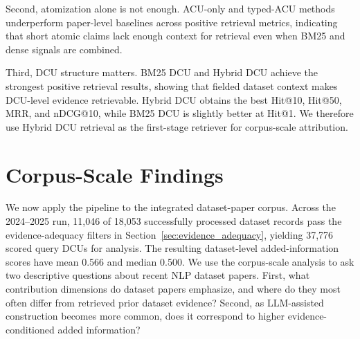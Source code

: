 \documentclass[11pt]{article}
\begin{document}
Second, atomization alone is not enough.
ACU-only and typed-ACU methods underperform paper-level baselines across positive retrieval metrics, indicating that short atomic claims lack enough context for retrieval even when BM25 and dense signals are combined.

Third, DCU structure matters.
BM25 DCU and Hybrid DCU achieve the strongest positive retrieval results, showing that fielded dataset context makes DCU-level evidence retrievable.
Hybrid DCU obtains the best Hit@10, Hit@50, MRR, and nDCG@10, while BM25 DCU is slightly better at Hit@1.
We therefore use Hybrid DCU retrieval as the first-stage retriever for corpus-scale attribution.
\section{Corpus-Scale Findings}

We now apply the pipeline to the integrated dataset-paper corpus.
Across the 2024--2025 run, 11,046 of 18,053 successfully processed dataset records pass the evidence-adequacy filters in Section~\ref{sec:evidence_adequacy}, yielding 37,776 scored query DCUs for analysis.
The resulting dataset-level added-information scores have mean 0.566 and median 0.500.
We use the corpus-scale analysis to ask two descriptive questions about recent NLP dataset papers.
First, what contribution dimensions do dataset papers emphasize, and where do they most often differ from retrieved prior dataset evidence?
Second, as LLM-assisted construction becomes more common, does it correspond to higher evidence-conditioned added information?
\end{document}
